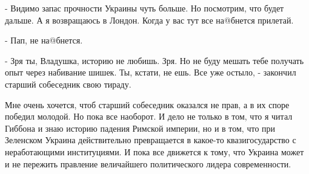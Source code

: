 - Видимо запас прочности Украины чуть больше. Но посмотрим, что будет дальше. А
я возвращаюсь в Лондон. Когда у вас тут все на@бнется прилетай. 

- Пап, не на@бнется.

- Зря ты, Владушка, историю не любишь. Зря. Но не буду мешать тебе получать
опыт через набивание шишек. Ты, кстати, не ешь. Все уже остыло, - закончил
старший собеседник свою тираду.

Мне очень хочется, чтоб старший собеседник оказался не прав, а в их споре
победил молодой. Но пока все наоборот. И дело не только в том, что я читал
Гиббона и знаю историю падения Римской империи, но и в том, что при Зеленском
Украина действительно превращается в какое-то квазигосударство с неработающими
институциями. И пока все движется к тому, что Украина может и не пережить
правление величайшего политического лидера современности.

